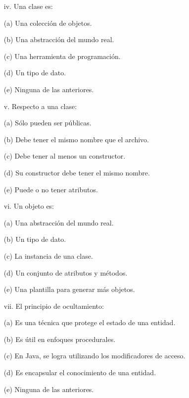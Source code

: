 \documentclass[10pt]{article}
\begin{document}
{\begin{enumerate}
\begin{multicols}{2}
    \begin{enumerate}[label=(\alph*)]
        \item[iv.] Una clase es: 
        \item[(a)] Una colecci\'on de objetos.
        \item[(b)] Una abstracci\'on del mundo real.
        \item[(c)] Una herramienta de programaci\'on.
        \item[(d)] Un tipo de dato.
        \item[(e)] Ninguna de las anteriores.
    \end{enumerate}

    \begin{enumerate}[label=(\alph*)]
        \item[v.] Respecto a una clase:
        \item[(a)] S\'olo pueden ser p\'ublicas.
        \item[(b)] Debe tener el mismo nombre que el archivo.
        \item[(c)] Debe tener al menos un constructor.
        \item[(d)] Su constructor debe tener el mismo nombre.
        \item[(e)] Puede o no tener atributos.
        \item[]
    \end{enumerate}

    \begin{enumerate}[label=(\alph*)]
        \item[vi.] Un objeto es: 
        \item[(a)] Una abstracci\'on del mundo real.
        \item[(b)] Un tipo de dato.
        \item[(c)] La instancia de una clase.
        \item[(d)] Un conjunto de atributos y m\'etodos.
        \item[(e)] Una plantilla para generar m\'as objetos.
    \end{enumerate}

    \begin{enumerate}[label=(\alph*)]
        \item[vii.] El principio de ocultamiento: 
        \item[(a)] Es una t\'ecnica que protege el estado de una entidad.
        \item[(b)] Es \'util en enfoques procedurales.
        \item[(c)] En Java, se logra utilizando los modificadores de acceso.
        \item[(d)] Es encapsular el conocimiento de una entidad.
        \item[(e)] Ninguna de las anteriores.
    \end{enumerate}


\end{multicols}
\end{enumerate}}
\end{document}
